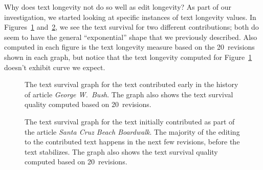 Why does text longevity not do so well as edit longevity?
As part of our investigation, we started looking at specific
instances of text longevity values.
In Figures~\ref{fig:ts-GeorgeWBush} and~\ref{fig:ts-SantaCruzBeachBoardwalk},
we see the text survival for two different contributions;
both do seem to have the general ``exponential'' shape
that we previously described.
Also computed in each figure is the text longevity measure based on
the 20~revisions shown in each graph, but notice that the text
longevity computed for
Figure~\ref{fig:ts-GeorgeWBush} doesn't exhibit curve we expect.

\begin{figure}[tbph]
\centering
{}
\caption{The text survival graph for the text contributed early
        in the history of article \textit{George W.~Bush}.
	The graph also shows the text survival quality
	computed based on 20~revisions.
	}
\label{fig:ts-GeorgeWBush}
\end{figure}

\begin{figure}[tbph]
\centering
{}
\caption{The text survival graph for the text initially contributed
	as part of the article \textit{Santa Cruz Beach Boardwalk}.
	The majority of the editing to the contributed text happens
	in the next few revisions, before the text stabilizes.
	The graph also shows the text survival quality
	computed based on 20~revisions.
	}
\label{fig:ts-SantaCruzBeachBoardwalk}
\end{figure}

